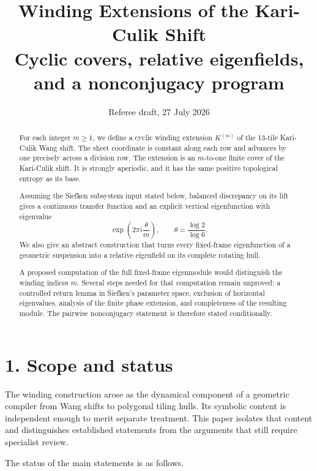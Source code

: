 \documentclass[11pt]{article}
\title{Winding Extensions of the Kari-Culik Shift\\[0.4em]\large Cyclic covers, relative eigenfields, and a nonconjugacy program}
\author{}
\date{Referee draft, 27 July 2026}
\begin{document}
\maketitle


\begin{abstract}

For each integer \(m\geq 1\), we define a cyclic winding extension
\(K^{(m)}\) of the 13-tile Kari-Culik Wang shift. The sheet coordinate is
constant along each row and advances by one precisely across a division row.
The extension is an \(m\)-to-one finite cover of the Kari-Culik shift. It is
strongly aperiodic, and it has the same positive topological entropy as its
base.

Assuming the Siefken subsystem input stated below, balanced discrepancy on
its lift gives a continuous transfer function and an explicit vertical
eigenfunction with eigenvalue
\[
  \exp\left(2\pi i\frac{\theta}{m}\right),
  \qquad
  \theta=\frac{\log 2}{\log 6}.
\]
We also give an abstract construction that turns every fixed-frame
eigenfunction of a geometric suspension into a relative eigenfield on its
complete rotating hull.

A proposed computation of the full fixed-frame eigenmodule would distinguish
the winding indices \(m\). Several steps needed for that computation remain
unproved: a controlled return lemma in Siefken's parameter space, exclusion
of horizontal eigenvalues, analysis of the finite phase extension, and
completeness of the resulting module. The pairwise nonconjugacy statement is
therefore stated conditionally.

\end{abstract}
\section*{1. Scope and status}

The winding construction arose as the dynamical component of a geometric
compiler from Wang shifts to polygonal tiling hulls. Its symbolic content is
independent enough to merit separate treatment. This paper isolates that
content and distinguishes established statements from the arguments that
still require specialist review.

The status of the main statements is as follows.
\end{document}
